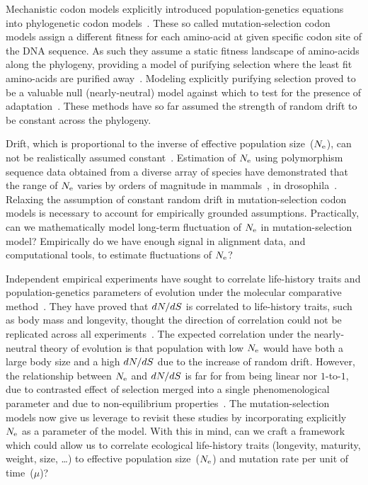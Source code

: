 Mechanistic \gls{codon} models explicitly introduced population-genetics equations into phylogenetic \gls{codon} models~\citep{Halpern1998}.
These so called mutation-selection \gls{codon} models assign a different fitness for each amino-acid at given specific \gls{codon} site of the \acrshort{DNA} sequence.
As such they assume a static fitness landscape of amino-acids along the phylogeny, providing a model of purifying selection where the least fit amino-acids are purified away~\citep{Rodrigue2010,Rodrigue2014,Tamuri2012,Tamuri2014}.
Modeling explicitly purifying selection proved to be a valuable null (\gls{nearly-neutral}) model against which to test for the presence of adaptation~\citep{Rodrigue2016,Bloom2017}.
These methods have so far assumed the strength of random drift to be constant across the phylogeny.

Drift, which is proportional to the inverse of effective population size~($N_{\mathrm{e}}$), can not be realistically assumed constant~\citep{Ohta1992}.
Estimation of $N_{\mathrm{e}}$ using polymorphism sequence data obtained from a diverse array of species have demonstrated that the range of $N_{\mathrm{e}}$ varies by orders of magnitude in mammals~\citep{Galtier2016}, in drosophila~\citep{Benger2013,Keightley2016}.
Relaxing the assumption of constant random drift in mutation-selection \gls{codon} models is necessary to account for empirically grounded
assumptions.
Practically, can we mathematically model long-term fluctuation of $N_{\mathrm{e}}$ in mutation-selection model?
Empirically do we have enough signal in alignment data, and computational tools, to estimate fluctuations of $N_{\mathrm{e}}$?

Independent empirical experiments have sought to correlate life-history traits and population-genetics parameters of evolution under the molecular comparative method~\citep{Lartillot2011,Weber2014}.
They have proved that $dN/dS$ is correlated to life-history traits, such as body mass and longevity, thought the direction of correlation could not be replicated across all experiments~\citep{Figuet2016}.
The expected correlation under the \gls{nearly-neutral} theory of evolution is that population with low $N_{\mathrm{e}}$ would have both a large body size and a high $dN/dS$ due to the increase of random drift.
However, the relationship between $N_{\mathrm{e}}$ and $dN/dS$ is far for from being linear nor $1$-to-$1$, due to contrasted effect of selection merged into a single phenomenological parameter and due to non-equilibrium properties~\citep{Jones2016}.
The mutation-selection models now give us leverage to revisit these studies by incorporating explicitly $N_{\mathrm{e}}$ as a parameter of the model.
With this in mind, can we craft a framework which could allow us to correlate ecological life-history traits (longevity, maturity, weight, size, \ldots) to effective population size~($N_{\mathrm{e}}$) and mutation rate per unit of time~($\mu$)?

